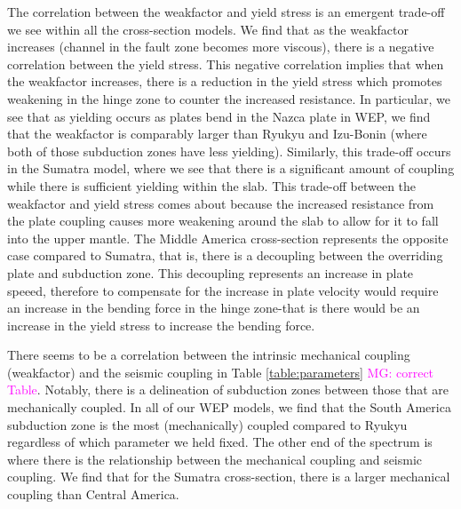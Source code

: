 \documentclass[12pt]{article}
\newcommand{\mgnote}[1]{\textcolor{magenta}{MG: #1}}
\begin{document}
{  The correlation between the weakfactor and yield stress is an emergent trade-off we see within all the cross-section models. We find that as the weakfactor increases (channel in the fault zone becomes more viscous), there is a negative correlation between the yield stress. This negative correlation implies that when the weakfactor increases, there is a reduction in the yield stress which promotes weakening in the hinge zone to counter the increased resistance. In particular, we see that as yielding occurs as plates bend in the Nazca plate in WEP, we find that the weakfactor is comparably larger than Ryukyu and Izu-Bonin (where both of those subduction zones have less yielding). Similarly, this trade-off occurs in the Sumatra model, where we see that there is a significant amount of coupling while there is sufficient yielding within the slab. This trade-off between the weakfactor and yield stress comes about because the increased resistance from the plate coupling causes more weakening around the slab to allow for it to fall into the upper mantle.  The Middle America cross-section represents the opposite case compared to Sumatra, that is, there is a decoupling between the overriding plate and subduction zone. This decoupling represents an increase in plate speeed, therefore to compensate for the increase in plate velocity would require an increase in the bending force in the hinge zone-that is there would be an increase in the yield stress to increase the bending force.
  
There seems to be a correlation between the intrinsic mechanical coupling (weakfactor) and the seismic coupling in Table \ref{table:parameters} \mgnote{correct Table}. Notably, there is a delineation of subduction zones between those that are mechanically coupled. In all of our WEP models, we find that the South America subduction zone is the most (mechanically) coupled compared to Ryukyu regardless of which parameter we held fixed. The other end of the spectrum is where there is the relationship between the mechanical coupling and seismic coupling. We find that for the Sumatra cross-section, there is a larger mechanical coupling than Central America.
   
}
\end{document}
